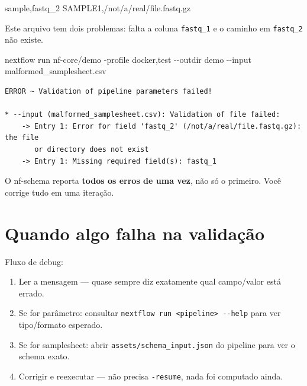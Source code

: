 \documentclass[
  brazilian,
  letterpaper,
  DIV=11,
  numbers=noendperiod]{scrreprt}
\newenvironment{Shaded}{\begin{snugshade}}{\end{snugshade}}
\newcommand{\AttributeTok}[1]{\textcolor[rgb]{0.40,0.45,0.13}{#1}}
\newcommand{\ExtensionTok}[1]{\textcolor[rgb]{0.00,0.23,0.31}{#1}}
\newcommand{\NormalTok}[1]{\textcolor[rgb]{0.00,0.23,0.31}{#1}}
\providecommand{\tightlist}{%
  \setlength{\itemsep}{0pt}\setlength{\parskip}{0pt}}
\begin{document}
\begin{Shaded}
\begin{Highlighting}[]
\NormalTok{sample,fastq\_2}
\NormalTok{SAMPLE1,/not/a/real/file.fastq.gz}
\end{Highlighting}
\end{Shaded}

Este arquivo tem dois problemas: falta a coluna \texttt{fastq\_1} e o
caminho em \texttt{fastq\_2} não existe.

\begin{Shaded}
\begin{Highlighting}[]
\ExtensionTok{nextflow}\NormalTok{ run nf{-}core/demo }\AttributeTok{{-}profile}\NormalTok{ docker,test }\AttributeTok{{-}{-}outdir}\NormalTok{ demo }\AttributeTok{{-}{-}input}\NormalTok{ malformed\_samplesheet.csv}
\end{Highlighting}
\end{Shaded}

\begin{verbatim}
ERROR ~ Validation of pipeline parameters failed!

* --input (malformed_samplesheet.csv): Validation of file failed:
    -> Entry 1: Error for field 'fastq_2' (/not/a/real/file.fastq.gz): the file
       or directory does not exist
    -> Entry 1: Missing required field(s): fastq_1
\end{verbatim}

\begin{tcolorbox}[enhanced jigsaw, arc=.35mm, bottomrule=.15mm, bottomtitle=1mm, breakable, colback=white, colbacktitle=quarto-callout-tip-color!10!white, colframe=quarto-callout-tip-color-frame, coltitle=black, left=2mm, leftrule=.75mm, opacityback=0, opacitybacktitle=0.6, rightrule=.15mm, title=\textcolor{quarto-callout-tip-color}{\faLightbulb}\hspace{0.5em}{Dica}, titlerule=0mm, toprule=.15mm, toptitle=1mm]

O nf-schema reporta \textbf{todos os erros de uma vez}, não só o
primeiro. Você corrige tudo em uma iteração.

\end{tcolorbox}

\section{Quando algo falha na
validação}\label{quando-algo-falha-na-validauxe7uxe3o}

Fluxo de debug:

\begin{enumerate}
\def\labelenumi{\arabic{enumi}.}
\tightlist
\item
  Ler a mensagem --- quase sempre diz exatamente qual campo/valor está
  errado.
\item
  Se for parâmetro: consultar
  \texttt{nextflow\ run\ \textless{}pipeline\textgreater{}\ -\/-help}
  para ver tipo/formato esperado.
\item
  Se for samplesheet: abrir \texttt{assets/schema\_input.json} do
  pipeline para ver o schema exato.
\item
  Corrigir e reexecutar --- não precisa \texttt{-resume}, nada foi
  computado ainda.
\end{enumerate}
\end{document}
